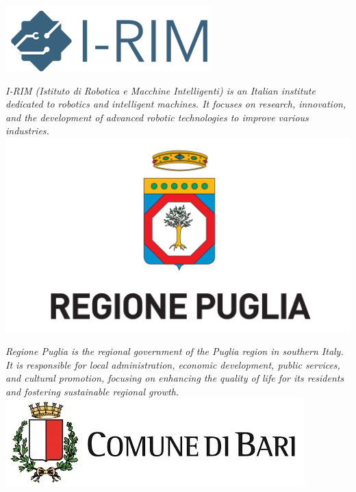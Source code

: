 \documentclass[
	openany, %
	parskip=full, %
	12pt, %
	a4paper, %
]{conferencebooklet} %
\begin{document}
\begin{multicols*}{2}
    \hfill\includegraphics[width=\sponsorscaling\linewidth]{logos/irim.png}\hspace*{\fill}

    \textit{I-RIM (Istituto di Robotica e Macchine Intelligenti) is an Italian institute dedicated to robotics and intelligent machines. It focuses on research, innovation, and the development of advanced robotic technologies to improve various industries.} \\
    
   \hfill\includegraphics[width=\sponsorscaling\linewidth]{logos/RegionePuglia.png}\hspace*{\fill}

   \textit{Regione Puglia is the regional government of the Puglia region in southern Italy. It is responsible for local administration, economic development, public services, and cultural promotion, focusing on enhancing the quality of life for its residents and fostering sustainable regional growth.} \\

   \hfill\includegraphics[width=\sponsorscaling\linewidth]{logos/bari.png}\hspace*{\fill}


\end{multicols*}
\end{document}
